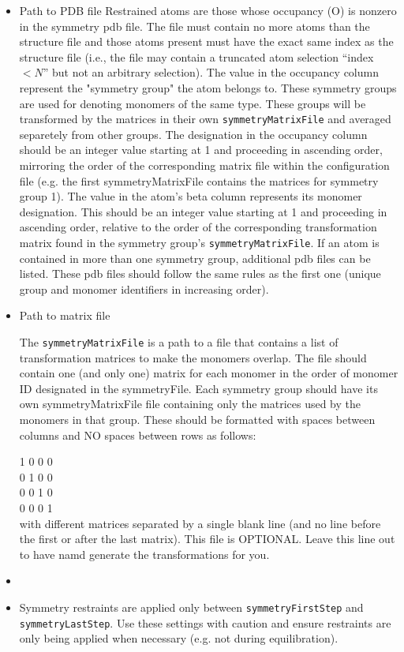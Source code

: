 \begin{itemize}
\item
{}
{Path to PDB file}
{
Restrained atoms are those whose occupancy (O) is nonzero in the symmetry pdb file.
The file must contain no more atoms than the structure file and those atoms
present must have the exact same index as the structure file (i.e., the file
may contain a truncated atom selection ``index $< N$'' but not an arbitrary selection).
The value in
the occupancy column represent the "symmetry group" the atom belongs to.  These symmetry
groups are used for denoting monomers of the same type.  These groups will be transformed by the
matrices in their own {\tt symmetryMatrixFile} and averaged separetely from other groups.  
The designation in the occupancy column should be an integer value starting at 1 and proceeding
in ascending order, mirroring the order of the corresponding matrix file within the configuration file
(e.g. the first symmetryMatrixFile contains the matrices for symmetry group 1).  
The value in the atom's beta column represents its monomer designation.  This should be an integer
value starting at 1 and proceeding in ascending order, relative to the order of the corresponding
transformation matrix found in the symmetry group's {\tt symmetryMatrixFile}.
If an atom is contained in more than one symmetry group, additional pdb files can be listed.
These pdb files should follow the same rules as the first one (unique group and monomer identifiers
in increasing order).  
}

\item
{}
{Path to matrix file}
{
The {\tt symmetryMatrixFile} is a path to a file that contains a list of transformation
matrices to make the monomers overlap.  The file should contain one (and only one)
matrix for each monomer in the order of monomer ID designated in the symmetryFile.
Each symmetry group should have its own symmetryMatrixFile file containing only the matrices
used by the monomers in that group.  
These should be formatted with spaces between columns and
NO spaces between rows as follows:

1 0 0 0 \\
0 1 0 0 \\
0 0 1 0 \\ 
0 0 0 1 \\

with different matrices separated by a single blank line (and no line before the first or after
the last matrix).  This file is
OPTIONAL.  Leave this line out to have namd generate the transformations
for you.
}
\item
{} {}
\item
{}
{ Symmetry restraints are applied only between {\tt symmetryFirstStep} and {\tt symmetryLastStep}.
Use these settings with caution and ensure restraints are only being applied when necessary (e.g. not
during equilibration).  }

\end{itemize}

